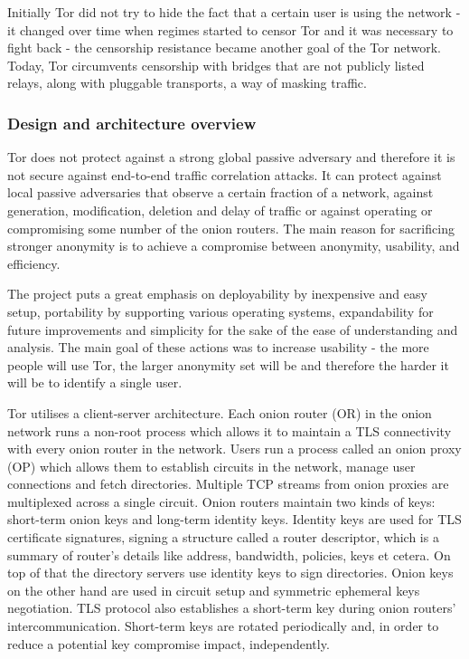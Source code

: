 Initially Tor did not try to hide the fact that a certain user is using the network - it changed over time when regimes started to censor Tor and it was necessary to fight back - the censorship resistance became another goal of the Tor network. Today, Tor circumvents censorship with bridges that are not publicly listed relays, along with pluggable transports, a way of masking traffic.

\subsubsection{Design and architecture overview}
Tor does not protect against a strong global passive adversary and therefore it is not secure against end-to-end traffic correlation attacks. It can protect against local passive adversaries that observe a certain fraction of a network, against generation, modification, deletion and delay of traffic or against operating or compromising some number of the onion routers. The main reason for sacrificing stronger anonymity is to achieve a compromise between anonymity, usability, and efficiency.

The project puts a great emphasis on deployability by inexpensive and easy setup, portability by supporting various operating systems, expandability for future improvements and simplicity for the sake of the ease of understanding and analysis. The main goal of these actions was to increase usability - the more people will use Tor, the larger anonymity set will be and therefore the harder it will be to identify a single user.

Tor utilises a client-server architecture. Each onion router (OR) in the onion network runs a non-root process which allows it to maintain a TLS connectivity with every onion router in the network. Users run a process called an onion proxy (OP) which allows them to establish circuits in the network, manage user connections and fetch directories. Multiple TCP streams from onion proxies are multiplexed across a single circuit. Onion routers maintain two kinds of keys: short-term onion keys and long-term identity keys. Identity keys are used for TLS certificate signatures, signing a structure called a router descriptor, which is a summary of router’s details like address, bandwidth, policies, keys et cetera. On top of that the directory servers use identity keys to sign directories. Onion keys on the other hand are used in circuit setup and symmetric ephemeral keys negotiation. TLS protocol also establishes a short-term key during onion routers’ intercommunication. Short-term keys are rotated periodically and, in order to reduce a potential key compromise impact, independently. 

